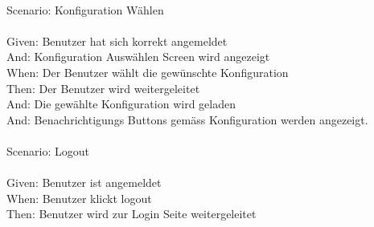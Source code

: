 \begin{tabbing}
    \\
    Scenario: \> \>  Konfiguration Wählen\\ \\
    Given: \> \>  Benutzer hat sich korrekt angemeldet\\
    And: \> \>    Konfiguration Auswählen Screen wird angezeigt\\
    When: \> \>   Der Benutzer wählt die gewünschte Konfiguration\\
    Then: \> \>   Der Benutzer wird weitergeleitet\\
    And: \> \>    Die gewählte Konfiguration wird geladen\\
    And: \> \>    Benachrichtigungs Buttons gemäss Konfiguration werden angezeigt.\\ \\


    Scenario:  \> \> Logout\\ \\
    Given: \> \>  Benutzer ist angemeldet\\
    When: \> \>   Benutzer klickt logout\\
    Then: \> \>  Benutzer wird zur Login Seite weitergeleitet\\
\end{tabbing}

\clearpage

